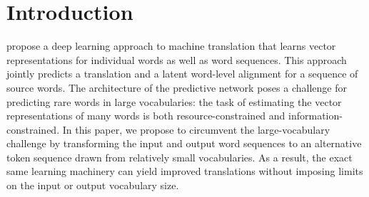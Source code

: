 \section{Introduction}
\label{sec:intro}

 propose a deep learning approach to
machine translation that learns vector representations for individual words as
well as word sequences. This approach jointly predicts a translation and a
latent word-level alignment for a sequence of source words. The architecture of
the predictive network poses a challenge for predicting rare words in large
vocabularies: the task of estimating the vector representations of many words
is both resource-constrained and information-constrained. In this paper, we
propose to circumvent the large-vocabulary challenge by transforming the input
and output word sequences to an alternative token sequence drawn from
relatively small vocabularies. As a result, the exact same learning machinery
can yield improved translations without imposing limits on the input or output
vocabulary size.


